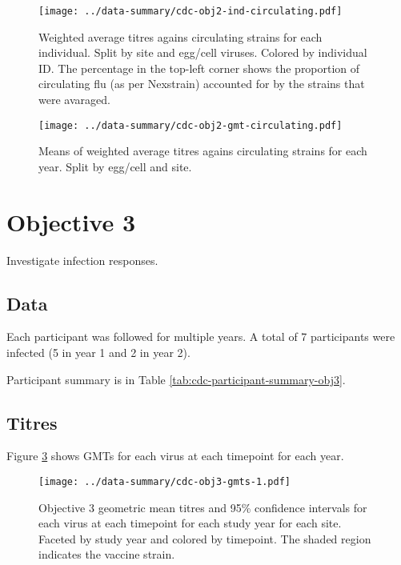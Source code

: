\documentclass[12pt]{article}
\begin{document}
\begin{figure}
	\texttt{[image: ../data-summary/cdc-obj2-ind-circulating.pdf]}
	\caption{Weighted average titres agains circulating strains for each individual. Split by site and egg/cell viruses. Colored by individual ID.  The percentage in the top-left corner shows the proportion of circulating flu (as per Nexstrain) accounted for by the strains that were avaraged.}
	\label{fig:cdc-obj2-ind-circulating}
\end{figure}

\begin{figure}
	\texttt{[image: ../data-summary/cdc-obj2-gmt-circulating.pdf]}
	\caption{Means of weighted average titres agains circulating strains for each year. Split by egg/cell and site.}
	\label{fig:cdc-obj2-gmt-circulating}
\end{figure}

\section{Objective 3}

Investigate infection responses.

\subsection{Data}

Each participant was followed for multiple years. A total of 7 participants
were infected (5 in year 1 and 2 in year 2).

Participant summary is in Table \ref{tab:cdc-participant-summary-obj3}.



\subsection{Titres}

Figure \ref{fig:cdc-obj3-gmts-1} shows GMTs for each virus at each timepoint for each year.

\begin{figure}
	\texttt{[image: ../data-summary/cdc-obj3-gmts-1.pdf]}
	\caption{Objective 3 geometric mean titres and 95\% confidence intervals for each virus at each timepoint for each study year for each site. Faceted by study year and colored by timepoint. The shaded region indicates the vaccine strain.}
	\label{fig:cdc-obj3-gmts-1}
\end{figure}
\end{document}
